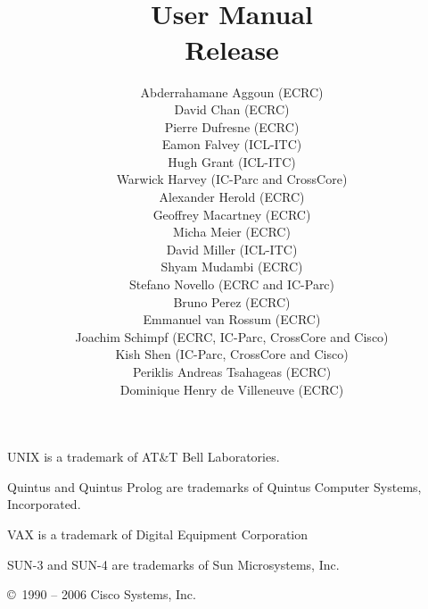 \documentclass[11pt,a4paper]{book}
\title{
    {\Large\bf {\eclipse}}\\
    \vspace{1cm}
    {\Huge\bf User Manual}\\
    \vspace{1cm}
    Release \eclipseversion}
\author{
Abderrahamane Aggoun (ECRC) \\
David Chan (ECRC) \\
Pierre Dufresne (ECRC) \\
Eamon Falvey (ICL-ITC) \\
Hugh Grant (ICL-ITC) \\
Warwick Harvey (IC-Parc and CrossCore) \\
Alexander Herold (ECRC) \\
Geoffrey Macartney (ECRC) \\
Micha Meier (ECRC) \\
David Miller (ICL-ITC) \\
Shyam Mudambi (ECRC) \\
Stefano Novello (ECRC and IC-Parc) \\
Bruno Perez (ECRC) \\
Emmanuel van Rossum (ECRC) \\
Joachim Schimpf (ECRC, IC-Parc, CrossCore and Cisco) \\
Kish Shen (IC-Parc, CrossCore and Cisco)\\
Periklis Andreas Tsahageas (ECRC) \\
Dominique Henry de Villeneuve (ECRC) \\
}
\begin{document}
\nocite{sepex,eventh,environ,compnd,arch}


\maketitle


\setcounter{page}{2}
\pagestyle{empty}

\vfill
{}

\bigskip\bigskip
UNIX is a trademark of AT\&T Bell Laboratories.

Quintus and Quintus Prolog are trademarks of
Quintus Computer Systems, Incorporated.

VAX is a trademark of Digital Equipment Corporation

SUN-3 and SUN-4 are trademarks of Sun Microsystems, Inc.

\bigskip\bigskip\bigskip\bigskip\bigskip\bigskip

\copyright\ 1990 -- 2006 Cisco Systems, Inc.

\bigskip\bigskip\bigskip\bigskip\bigskip\bigskip

\cleardoublepage
\pagestyle{plain}

\tableofcontents

\cleardoublepage
{}








%

















\appendix




%



\newpage
\printindex

\newpage


\end{document}
